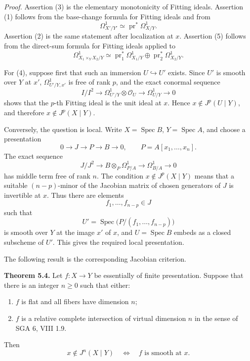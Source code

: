 \documentclass[11pt]{article}
\providecommand{\Spec}{\operatorname{Spec}}
\providecommand{\pr}{\operatorname{pr}}
\providecommand{\Oo}{\mathcal O}
\begin{document}
\emph{Proof.}  Assertion (3) is the elementary monotonicity of Fitting ideals.  Assertion (1) follows from the base-change formula for Fitting ideals and from
\[
        \Omega^1_{X'/Y'}\simeq \pr^*\Omega^1_{X/Y}.
\]
Assertion (2) is the same statement after localization at \(x\).  Assertion (5) follows from the direct-sum formula for Fitting ideals applied to
\[
        \Omega^1_{X_1\times_YX_2/Y}
        \simeq
        \pr_1^*\Omega^1_{X_1/Y}\oplus
        \pr_2^*\Omega^1_{X_2/Y}.
\]

For (4), suppose first that such an immersion \(U\hookrightarrow U'\) exists.  Since \(U'\) is smooth over \(Y\) at \(x'\), \(\Omega^1_{U'/Y,x'}\) is free of rank \(p\), and the exact conormal sequence
\[
        I/I^2\longrightarrow
        \Omega^1_{U'/Y}\otimes\Oo_U\longrightarrow
        \Omega^1_{U/Y}\longrightarrow 0
\]
shows that the \(p\)-th Fitting ideal is the unit ideal at \(x\).  Hence \(x\notin J^p(U\mid Y)\), and therefore \(x\notin J^p(X\mid Y)\).

Conversely, the question is local.  Write \(X=\Spec B\), \(Y=\Spec A\), and choose a presentation
\[
        0\longrightarrow J\longrightarrow P\longrightarrow B\longrightarrow 0,
        \qquad
        P=A[x_1,\ldots,x_n].
\]
The exact sequence
\[
        J/J^2\longrightarrow B\otimes_P\Omega^1_{P/A}
        \longrightarrow \Omega^1_{B/A}\longrightarrow 0
\]
has middle term free of rank \(n\).  The condition \(x\notin J^p(X\mid Y)\) means that a suitable \((n-p)\)-minor of the Jacobian matrix of chosen generators of \(J\) is invertible at \(x\).  Thus there are elements
\[
        f_1,\ldots,f_{n-p}\in J
\]
such that
\[
        U'=\Spec\bigl(P/(f_1,\ldots,f_{n-p})\bigr)
\]
is smooth over \(Y\) at the image \(x'\) of \(x\), and \(U=\Spec B\) embeds as a closed subscheme of \(U'\).  This gives the required local presentation.

The following result is the corresponding Jacobian criterion.

\textbf{Theorem 5.4.}  Let \(f:X\to Y\) be essentially of finite presentation.  Suppose that there is an integer \(n\geq 0\) such that either:
\begin{enumerate}[label=(\arabic*)]
\item \(f\) is flat and all fibers have dimension \(n\);
\item \(f\) is a relative complete intersection of virtual dimension \(n\) in the sense of SGA 6, VIII 1.9.
\end{enumerate}
Then
\[
        x\notin J^n(X\mid Y)
        \quad\Longleftrightarrow\quad
        f\text{ is smooth at }x.
\]
\end{document}
